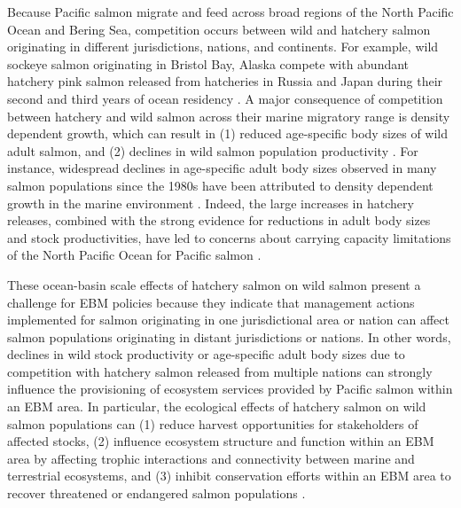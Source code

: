 Because Pacific salmon migrate and feed across broad regions of the North
Pacific Ocean and Bering Sea, competition occurs between wild and hatchery
salmon originating in different jurisdictions, nations, and continents. For
example, wild sockeye salmon originating in Bristol Bay, Alaska compete with
abundant hatchery pink salmon released from hatcheries in Russia and Japan
during their second and third years of ocean residency \citep{Ruggerone2003a}. A
major consequence of competition between hatchery and wild salmon across their
marine migratory range is density dependent growth, which can result in (1)
reduced age-specific body sizes of wild adult salmon, and (2) declines in wild
salmon population productivity \citep{Ruggerone2015, Ruggerone2003a}. For
instance, widespread declines in age-specific adult body sizes observed in many
salmon populations since the 1980s have been attributed to density dependent
growth in the marine environment \citep{Ricker1981a, Ishida1993a, Pyper1999a}.
Indeed, the large increases in hatchery releases, combined with the strong
evidence for reductions in adult body sizes and stock productivities, have led
to concerns about carrying capacity limitations of the North Pacific Ocean for
Pacific salmon \citep{Pearcy1999a, Nielsen2009a}.

These ocean-basin scale effects of hatchery salmon on wild salmon present a
challenge for EBM policies because they indicate that management actions
implemented for salmon originating in one jurisdictional area or nation can
affect salmon populations originating in distant jurisdictions or nations. In
other words, declines in wild stock productivity or age-specific adult body
sizes due to competition with hatchery salmon released from multiple nations can
strongly influence the provisioning of ecosystem services provided by Pacific
salmon within an EBM area. In particular, the ecological effects of hatchery
salmon on wild salmon populations can (1) reduce harvest opportunities for
stakeholders of affected stocks, (2) influence ecosystem structure and function
within an EBM area by affecting trophic interactions and connectivity between
marine and terrestrial ecosystems, and (3) inhibit conservation efforts within
an EBM area to recover threatened or endangered salmon populations
\citep{Ruggerone2003a, Nielsen2009a}.

